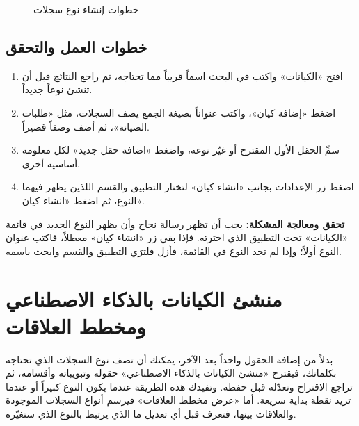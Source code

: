 \begin{figure}[H]
\centering
{}
\rclegend
\caption{خطوات إنشاء نوع سجلات}
\label{fig:builder-entities-flow}
\end{figure}

\subsection{خطوات العمل والتحقق}
\begin{enumerate}
\item افتح «الكيانات» واكتب في البحث اسماً قريباً مما تحتاجه، ثم راجع النتائج قبل أن تنشئ نوعاً جديداً.
\item اضغط «إضافة كيان»، واكتب عنواناً بصيغة الجمع يصف السجلات، مثل «طلبات الصيانة»، ثم أضف وصفاً قصيراً.
\item سمِّ الحقل الأول المقترح أو غيّر نوعه، واضغط «اضافة حقل جديد» لكل معلومة أساسية أخرى.
\item اضغط زر الإعدادات بجانب «انشاء كيان» لتختار التطبيق والقسم اللذين يظهر فيهما النوع، ثم اضغط «انشاء كيان».
\end{enumerate}

\textbf{تحقق ومعالجة المشكلة:} يجب أن تظهر رسالة نجاح وأن يظهر النوع الجديد في قائمة «الكيانات» تحت التطبيق الذي اخترته. فإذا بقي زر «انشاء كيان» معطلاً، فاكتب عنوان النوع أولاً؛ وإذا لم تجد النوع في القائمة، فأزل فلترَي التطبيق والقسم وابحث باسمه.

\clearpage
\section{منشئ الكيانات بالذكاء الاصطناعي ومخطط العلاقات}
\label{sec:builder-feature-ai-builder}

بدلاً من إضافة الحقول واحداً بعد الآخر، يمكنك أن تصف نوع السجلات الذي تحتاجه بكلماتك، فيقترح «منشئ الكيانات بالذكاء الاصطناعي» حقوله وتبويباته وأقسامه، ثم تراجع الاقتراح وتعدّله قبل حفظه. وتفيدك هذه الطريقة عندما يكون النوع كبيراً أو عندما تريد نقطة بداية سريعة. أما «عرض مخطط العلاقات» فيرسم أنواع السجلات الموجودة والعلاقات بينها، فتعرف قبل أي تعديل ما الذي يرتبط بالنوع الذي ستغيّره.

